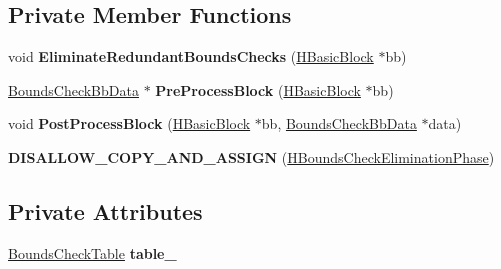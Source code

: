 \subsection*{Private Member Functions}
\begin{DoxyCompactItemize}
\item 
void {\bfseries Eliminate\+Redundant\+Bounds\+Checks} (\hyperlink{classv8_1_1internal_1_1_h_basic_block}{H\+Basic\+Block} $\ast$bb)\hypertarget{classv8_1_1internal_1_1_h_bounds_check_elimination_phase_a2c46c479af7c769284a1a4f7fdbea96c}{}\label{classv8_1_1internal_1_1_h_bounds_check_elimination_phase_a2c46c479af7c769284a1a4f7fdbea96c}

\item 
\hyperlink{classv8_1_1internal_1_1_bounds_check_bb_data}{Bounds\+Check\+Bb\+Data} $\ast$ {\bfseries Pre\+Process\+Block} (\hyperlink{classv8_1_1internal_1_1_h_basic_block}{H\+Basic\+Block} $\ast$bb)\hypertarget{classv8_1_1internal_1_1_h_bounds_check_elimination_phase_a52995eb44a54c04cb78a847cdd238c5d}{}\label{classv8_1_1internal_1_1_h_bounds_check_elimination_phase_a52995eb44a54c04cb78a847cdd238c5d}

\item 
void {\bfseries Post\+Process\+Block} (\hyperlink{classv8_1_1internal_1_1_h_basic_block}{H\+Basic\+Block} $\ast$bb, \hyperlink{classv8_1_1internal_1_1_bounds_check_bb_data}{Bounds\+Check\+Bb\+Data} $\ast$data)\hypertarget{classv8_1_1internal_1_1_h_bounds_check_elimination_phase_a1b7695541423796c18e7ea1fc8483205}{}\label{classv8_1_1internal_1_1_h_bounds_check_elimination_phase_a1b7695541423796c18e7ea1fc8483205}

\item 
{\bfseries D\+I\+S\+A\+L\+L\+O\+W\+\_\+\+C\+O\+P\+Y\+\_\+\+A\+N\+D\+\_\+\+A\+S\+S\+I\+GN} (\hyperlink{classv8_1_1internal_1_1_h_bounds_check_elimination_phase}{H\+Bounds\+Check\+Elimination\+Phase})\hypertarget{classv8_1_1internal_1_1_h_bounds_check_elimination_phase_a5e3e50d3c8051266f55884d46aac9cca}{}\label{classv8_1_1internal_1_1_h_bounds_check_elimination_phase_a5e3e50d3c8051266f55884d46aac9cca}

\end{DoxyCompactItemize}
\subsection*{Private Attributes}
\begin{DoxyCompactItemize}
\item 
\hyperlink{classv8_1_1internal_1_1_bounds_check_table}{Bounds\+Check\+Table} {\bfseries table\+\_\+}\hypertarget{classv8_1_1internal_1_1_h_bounds_check_elimination_phase_a37c0eb7101a24ae75f367dff3fda50b6}{}\label{classv8_1_1internal_1_1_h_bounds_check_elimination_phase_a37c0eb7101a24ae75f367dff3fda50b6}

\end{DoxyCompactItemize}
